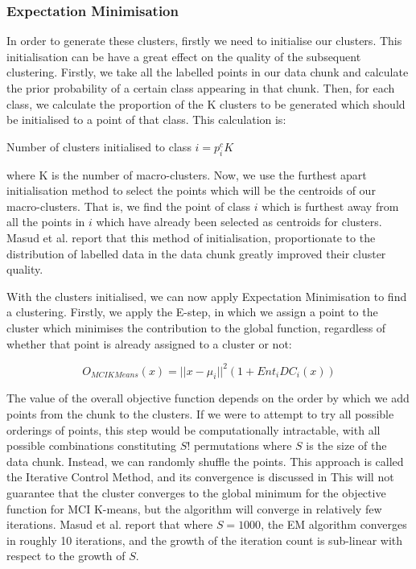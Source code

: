 \documentclass[12pt,a4paper,oneside]{report}
\begin{document}
 \subsubsection*{Expectation Minimisation} 
 In order to generate these clusters, firstly we need to initialise our clusters. This initialisation can be have a great effect on the quality of the subsequent clustering. Firstly, we take all the labelled points in our data chunk and calculate the prior probability of a certain class appearing in that chunk. Then, for each class, we calculate the proportion of the K clusters to be generated which should be initialised to a point of that class. This calculation is:
 
Number of clusters initialised to class \(i  = p_i^cK\) 

where K is the number of macro-clusters. Now, we use the furthest apart initialisation method to select the points which will be the centroids of our macro-clusters. That is, we find the point of class \(i\) which is furthest away from all the points in \(i\) which have already been selected as centroids for clusters. Masud et al. report that this method of initialisation, proportionate to the distribution of labelled data in the data chunk greatly improved their cluster quality.\cite{TechRep}

With the clusters initialised, we can now apply Expectation Minimisation to find a clustering. Firstly, we apply the E-step, in which we assign a point to the cluster which minimises the contribution to the global function, regardless of whether that point is already assigned to a cluster or not: 

 \[O_{MCIKMeans}(x) = || x - \mu_i||^2(1 + Ent_iDC_i(x)) \]
 
The value of the overall objective function depends on the order by which we add points from the chunk to the clusters. If we were to attempt to try all possible orderings of points, this step would be computationally intractable, with all possible combinations constituting $S!$ permutations where $S$ is the size of the data chunk.  Instead, we can randomly shuffle the points. This approach is called the Iterative Control Method, and its convergence is discussed in \cite{ICM} This will not guarantee that the cluster converges to the global minimum for the objective function for MCI K-means, but the algorithm will converge in relatively few iterations. Masud et al. report that where $S = 1000$, the EM algorithm converges in roughly 10 iterations, and the growth of the iteration count is sub-linear with respect to the growth of $S$.
\end{document}
